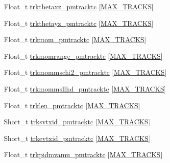 \begin{DoxyCompactItemize}
\item 
Float\-\_\-t \hyperlink{classanatree_aec0692e36120ad9fb508a85e2044e03d}{trkthetaxz\-\_\-pmtracktc} \mbox{[}\hyperlink{anatree__core__v09410002_8h_a327fd4e796e4a0d78947524c96e4362e}{M\-A\-X\-\_\-\-T\-R\-A\-C\-K\-S}\mbox{]}
\item 
Float\-\_\-t \hyperlink{classanatree_a85bee7d326090b7394d5eead814a4229}{trkthetayz\-\_\-pmtracktc} \mbox{[}\hyperlink{anatree__core__v09410002_8h_a327fd4e796e4a0d78947524c96e4362e}{M\-A\-X\-\_\-\-T\-R\-A\-C\-K\-S}\mbox{]}
\item 
Float\-\_\-t \hyperlink{classanatree_a33b7628b822ea1025e2a2972469e4a37}{trkmom\-\_\-pmtracktc} \mbox{[}\hyperlink{anatree__core__v09410002_8h_a327fd4e796e4a0d78947524c96e4362e}{M\-A\-X\-\_\-\-T\-R\-A\-C\-K\-S}\mbox{]}
\item 
Float\-\_\-t \hyperlink{classanatree_a8176079e5232f7cd94c2801faaa29bc3}{trkmomrange\-\_\-pmtracktc} \mbox{[}\hyperlink{anatree__core__v09410002_8h_a327fd4e796e4a0d78947524c96e4362e}{M\-A\-X\-\_\-\-T\-R\-A\-C\-K\-S}\mbox{]}
\item 
Float\-\_\-t \hyperlink{classanatree_a2bf0b888291307a4f5884e22a38dc28f}{trkmommschi2\-\_\-pmtracktc} \mbox{[}\hyperlink{anatree__core__v09410002_8h_a327fd4e796e4a0d78947524c96e4362e}{M\-A\-X\-\_\-\-T\-R\-A\-C\-K\-S}\mbox{]}
\item 
Float\-\_\-t \hyperlink{classanatree_a68586b90e0cfa3d2a08990cb05410d20}{trkmommsllhd\-\_\-pmtracktc} \mbox{[}\hyperlink{anatree__core__v09410002_8h_a327fd4e796e4a0d78947524c96e4362e}{M\-A\-X\-\_\-\-T\-R\-A\-C\-K\-S}\mbox{]}
\item 
Float\-\_\-t \hyperlink{classanatree_acdc8e9ab5e49db76b1ecbd092d1378eb}{trklen\-\_\-pmtracktc} \mbox{[}\hyperlink{anatree__core__v09410002_8h_a327fd4e796e4a0d78947524c96e4362e}{M\-A\-X\-\_\-\-T\-R\-A\-C\-K\-S}\mbox{]}
\item 
Short\-\_\-t \hyperlink{classanatree_ae7c4a4f0fbb6b7a01e50b1747d658fbc}{trksvtxid\-\_\-pmtracktc} \mbox{[}\hyperlink{anatree__core__v09410002_8h_a327fd4e796e4a0d78947524c96e4362e}{M\-A\-X\-\_\-\-T\-R\-A\-C\-K\-S}\mbox{]}
\item 
Short\-\_\-t \hyperlink{classanatree_a1b338a291e643d9837a16123871007aa}{trkevtxid\-\_\-pmtracktc} \mbox{[}\hyperlink{anatree__core__v09410002_8h_a327fd4e796e4a0d78947524c96e4362e}{M\-A\-X\-\_\-\-T\-R\-A\-C\-K\-S}\mbox{]}
\item 
Float\-\_\-t \hyperlink{classanatree_a1db8ef1a0e54ce2eb3c3082411a5ac90}{trkpidmvamu\-\_\-pmtracktc} \mbox{[}\hyperlink{anatree__core__v09410002_8h_a327fd4e796e4a0d78947524c96e4362e}{M\-A\-X\-\_\-\-T\-R\-A\-C\-K\-S}\mbox{]}

\end{DoxyCompactItemize}
